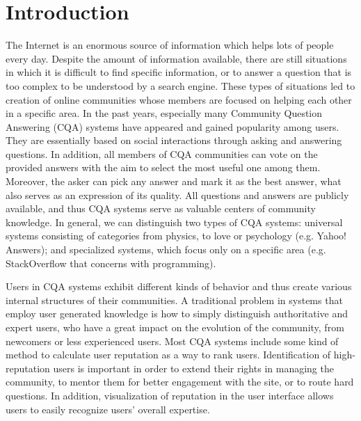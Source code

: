 \documentclass{llncs}
\begin{document}
	\section{Introduction}
		The Internet is an enormous source of information which helps lots of people
		every day. Despite the amount of information available, there are still situations
		in which it is difficult to find specific information, or to answer a question that is
		too complex to be understood by a search engine. These types of situations led
		to creation of online communities whose members are focused on helping each
		other in a specific area. In the past years, especially many Community Question
		Answering (CQA) systems have appeared and gained popularity among users.
		They are essentially based on social interactions through asking and answering
		questions. In addition, all members of CQA communities can vote on the provided
		answers with the aim to select the most useful one among them. Moreover,
		the asker can pick any answer and mark it as the best answer, what also serves
		as an expression of its quality. All questions and answers are publicly available,
		and thus CQA systems serve as valuable centers of community knowledge. In
		general, we can distinguish two types of CQA systems: universal systems consisting
		of categories from physics, to love or psychology (e.g. Yahoo! Answers);
		and specialized systems, which focus only on a specific area (e.g. StackOverflow
		that concerns with programming).
		
		Users in CQA systems exhibit different kinds of behavior and thus create various
		internal structures of their communities. A traditional problem in systems
		that employ user generated knowledge is how to simply distinguish authoritative
		and expert users, who have a great impact on the evolution of the community,
		from newcomers or less experienced users. Most CQA systems include some kind
		of method to calculate user reputation as a way to rank users. Identification of
		high-reputation users is important in order to extend their rights in managing
		the community, to mentor them for better engagement with the site, or to route
		hard questions. In addition, visualization of reputation in the user interface allows
		users to easily recognize users’ overall expertise.
\end{document}
